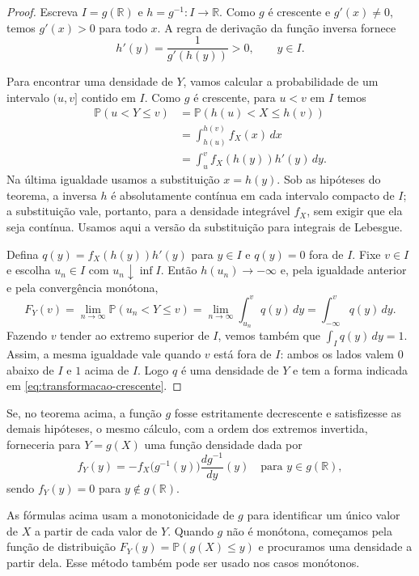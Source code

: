 \documentclass[12pt,portuguese]{article}
\theoremstyle{definition}
\theoremstyle{plainexercise}
\theoremstyle{starredexercise}
\theoremstyle{definition}
\begin{document}
\begin{proof}
  Escreva $I=g(\mathbb{R})$ e $h=g^{-1}:I\to\mathbb{R}$. Como $g$ é
  crescente e $g'(x)\neq 0$, temos $g'(x)>0$ para todo $x$. A regra de
  derivação da função inversa fornece
  \[
    h'(y)=\frac{1}{g'(h(y))}>0, \qquad y\in I.
  \]

  Para encontrar uma densidade de $Y$, vamos calcular a probabilidade de um
  intervalo $(u,v]$ contido em $I$. Como $g$ é crescente, para $u<v$ em $I$
  temos
  \[
    \begin{aligned}
      \mathbb{P}(u<Y\leqslant v)
      &=\mathbb{P}(h(u)<X\leqslant h(v))
      \\[0.3cm]
      &=\int_{h(u)}^{h(v)} f_X(x)\,dx
      \\[0.3cm]
      &=\int_u^v f_X(h(y))h'(y)\,dy.
    \end{aligned}
  \]
  Na última igualdade usamos a substituição $x=h(y)$. Sob as hipóteses
  do teorema, a inversa $h$ é absolutamente contínua em cada intervalo
  compacto de $I$; a substituição vale, portanto, para a densidade
  integrável $f_X$, sem exigir que ela seja contínua. Usamos aqui a
  versão da substituição para integrais de Lebesgue.

  Defina $q(y)=f_X(h(y))h'(y)$ para $y\in I$ e $q(y)=0$ fora de $I$.
  Fixe $v\in I$ e escolha $u_n\in I$ com $u_n\downarrow\inf I$.
  Então $h(u_n)\to-\infty$ e, pela igualdade anterior e pela
  convergência monótona,
  \[
    F_Y(v)=\lim_{n\to\infty}\mathbb{P}(u_n<Y\leqslant v)
    =\lim_{n\to\infty}\int_{u_n}^{v}q(y)\,dy
    =\int_{-\infty}^{v}q(y)\,dy.
  \]
  Fazendo $v$ tender ao extremo superior de $I$, vemos também que
  $\int_I q(y)\,dy=1$. Assim, a mesma igualdade vale quando $v$ está
  fora de $I$: ambos os lados valem $0$ abaixo de $I$ e $1$ acima de
  $I$. Logo $q$ é uma densidade
  de $Y$ e tem a forma indicada em \eqref{eq:transformacao-crescente}.
\end{proof}

Se, no teorema acima, a função $g$ fosse estritamente decrescente e satisfizesse as
demais hipóteses, o mesmo cálculo, com a ordem dos extremos invertida,
forneceria para $Y = g(X)$ uma função densidade dada por
\begin{equation}\label{eq:transformacao-decrescente}
  f_Y(y) = -f_X\bigl(g^{-1}(y)\bigr) \frac{dg^{-1}}{dy}(y) \quad \text{para
  } y \in g(\mathbb{R}),
\end{equation}
sendo $f_Y(y) = 0$ para $y \notin g(\mathbb{R})$.

As fórmulas acima usam a monotonicidade de $g$ para identificar um único
valor de $X$ a partir de cada valor de $Y$. Quando $g$ não é monótona,
começamos pela função de distribuição
$F_Y(y)=\mathbb{P}(g(X)\leqslant y)$ e procuramos uma densidade a partir
dela. Esse método também pode ser usado nos casos monótonos.
\end{document}
